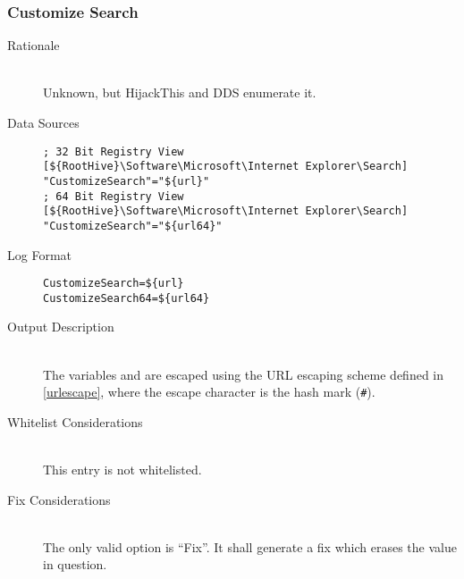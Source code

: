 \subsubsection{Customize Search}
\begin{description}
\item[Rationale] \hfill \\
Unknown, but HijackThis and DDS enumerate it.

\item[Data Sources] \hfill
\vspace{-\baselineskip}
\begin{verbatim}
; 32 Bit Registry View
[${RootHive}\Software\Microsoft\Internet Explorer\Search]
"CustomizeSearch"="${url}"
; 64 Bit Registry View
[${RootHive}\Software\Microsoft\Internet Explorer\Search]
"CustomizeSearch"="${url64}"
\end{verbatim}
\item[Log Format] \hfill
\vspace{-\baselineskip}
\begin{verbatim}
CustomizeSearch=${url}
CustomizeSearch64=${url64}
\end{verbatim}
\item[Output Description] \hfill \\
The variables  and  are escaped using the URL escaping
scheme defined in \ref{urlescape}, where the escape character is the hash mark
(\verb|#|).
\item[Whitelist Considerations] \hfill \\
This entry is not whitelisted.
\item[Fix Considerations] \hfill \\
The only valid option is ``Fix''. It shall generate a fix which erases the value
in question.
\end{description}

